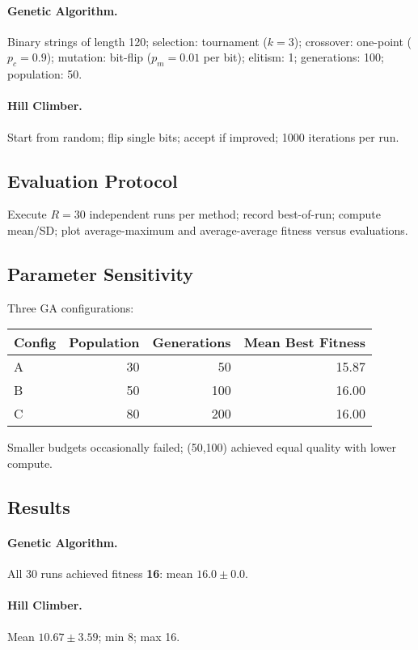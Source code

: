 \documentclass{article}
\begin{document}
\paragraph{Genetic Algorithm.}
Binary strings of length 120; selection: tournament ($k{=}3$); crossover: one-point ($p_c{=}0.9$); mutation: bit-flip ($p_m{=}0.01$ per bit); elitism: 1; generations: 100; population: 50.

\paragraph{Hill Climber.}
Start from random; flip single bits; accept if improved; 1000 iterations per run.

\subsection{Evaluation Protocol}
Execute $R{=}30$ independent runs per method; record best-of-run; compute mean/SD; plot average-maximum and average-average fitness versus evaluations.

\subsection{Parameter Sensitivity}
Three GA configurations:
\begin{table}[H]
\centering
\begin{tabular}{lrrr}
\toprule
Config & Population & Generations & Mean Best Fitness \\
\midrule
A & 30 & 50 & 15.87 \\
B & 50 & 100 & 16.00 \\
C & 80 & 200 & 16.00 \\
\bottomrule
\end{tabular}
\end{table}
Smaller budgets occasionally failed; (50,100) achieved equal quality with lower compute.

\subsection{Results}
\paragraph{Genetic Algorithm.}
All 30 runs achieved fitness \textbf{16}: mean $16.0 \pm 0.0$.

\paragraph{Hill Climber.}
Mean $10.67 \pm 3.59$; min 8; max 16.
\end{document}

